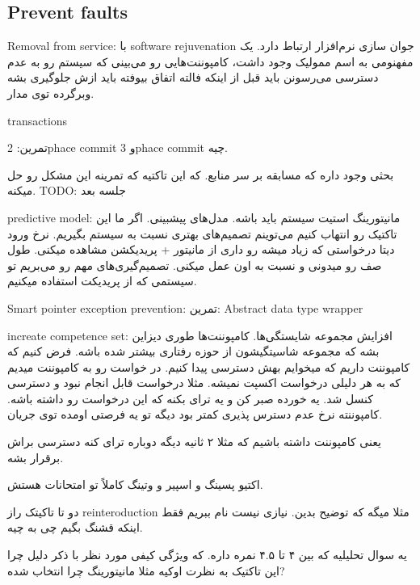 \subsection{Prevent faults}

Removal from service: با software rejuvenation جوان سازی نرم‌افزار ارتباط دارد.
یک مفهنومی به اسم ممولیک وجود داشت، کامپوننت‌هایی رو می‌بینی که سیستم رو به عدم
دسترسی می‌رسونن باید قبل از اینکه فالته اتفاق بیوفته باید ازش جلوگیری بشه
وبرگرده توی مدار.

transactions

تمرین: 2phace commit و 3phace commit چیه.

بحثی وجود داره که مسابقه بر سر منابع. که این تاکتیه که تمرینه این مشکل رو حل
میکنه.
TODO: جلسه بعد

predictive model: مانیتورینگ استیت سیستم باید باشه. مدل‌های پیشبینی. اگر ما این
تاکتیک رو انتهاب کنیم می‌توینم تصمیم‌های بهتری نسبت به سیستم بگیریم. نرخ ورود
دیتا درخواستی که زیاد میشه رو داری از مانیتور + پریدیکشن مشاهده میکنی. طول صف رو
میدونی و نسبت به اون عمل میکنی. تصمیم‌گیری‌های مهم رو می‌بریم تو سیستمی که از
پریدیکت استفاده میکنیم.

Smart pointer
exception prevention: تمرین: Abstract data type
wrapper

increate competence set: افزایش مجموعه شایستگی‌ها. کامپوننت‌ها طوری دیزاین بشه
که مجموعه شاسیتگیشون از حوزه رفتاری بیشتر شده باشه. فرض کنیم که کامپوننت داریم
که میخوایم بهش دسترسی پیدا کنیم. در خواست رو به کامپوننت میدیم که به هر دلیلی
درخواست اکسپت نمیشه. مثلا درخواست قابل انجام نبود و دسترسی کنسل شد. یه خورده صبر
کن و یه ترای بکنه که این درخواست رو داشته باشه. کامپوننته نرخ عدم دسترس پذیری
کمتر بود دیگه تو یه فرصتی اومده توی جریان.

یعنی کامپوننت داشته باشیم که مثلا ۲ ثانیه دیگه دوباره ترای کنه دسترسی براش
برقرار بشه.

اکتیو پسینگ و اسپیر و وتینگ کاملاً تو امتحانات هستش.

دو تا تاکیتک راز reinteroduction مثلا میگه که توضیح بدین. نیازی نیست نام ببریم
فقط اینکه قشنگ بگیم چی به چیه.

یه سوال تحلیلیه که بین ۴ تا ۴.۵ نمره داره. که ویژگی کیفی مورد نظر با ذکر دلیل
چرا این تاکتیک به نظرت اوکیه مثلا مانیتورینگ چرا انتخاب شده?
